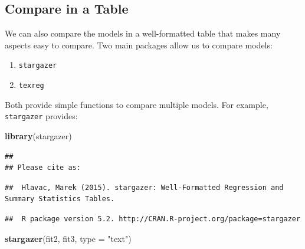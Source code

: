 \documentclass[]{tufte-book}
\newenvironment{Shaded}{}{}
\newcommand{\KeywordTok}[1]{\textcolor[rgb]{0.00,0.44,0.13}{\textbf{#1}}}
\newcommand{\DataTypeTok}[1]{\textcolor[rgb]{0.56,0.13,0.00}{#1}}
\newcommand{\StringTok}[1]{\textcolor[rgb]{0.25,0.44,0.63}{#1}}
\newcommand{\NormalTok}[1]{#1}
\providecommand{\tightlist}{%
  \setlength{\itemsep}{0pt}\setlength{\parskip}{0pt}}
\theoremstyle{definition}
\theoremstyle{definition}
\theoremstyle{remark}
\begin{document}
\subsection*{Compare in a Table}\label{compare-in-a-table}

We can also compare the models in a well-formatted table that makes many
aspects easy to compare. Two main packages allow us to compare models:

\begin{enumerate}
\def\labelenumi{\arabic{enumi}.}
\tightlist
\item
  \texttt{stargazer}
\item
  \texttt{texreg}
\end{enumerate}

Both provide simple functions to compare multiple models. For example,
\texttt{stargazer} provides:

\begin{Shaded}
\begin{Highlighting}[]
\KeywordTok{library}\NormalTok{(stargazer)}
\end{Highlighting}
\end{Shaded}

\begin{verbatim}
## 
## Please cite as:
\end{verbatim}

\begin{verbatim}
##  Hlavac, Marek (2015). stargazer: Well-Formatted Regression and Summary Statistics Tables.
\end{verbatim}

\begin{verbatim}
##  R package version 5.2. http://CRAN.R-project.org/package=stargazer
\end{verbatim}

\begin{Shaded}
\begin{Highlighting}[]
\KeywordTok{stargazer}\NormalTok{(fit2, fit3, }\DataTypeTok{type =} \StringTok{"text"}\NormalTok{)}
\end{Highlighting}
\end{Shaded}
\end{document}
